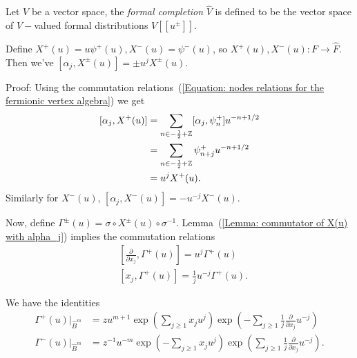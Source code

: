 \begin{dang}
    \begin{definition}
        Let $V$ be a vector space, the \textit{formal completion} $\hat{V}$ is defined to be the vector space of $V-$valued formal distributions $V[[u^\pm]]$.
    \end{definition}
\end{dang}
\begin{dang}
    \begin{lemma}\label{Lemma: commutator of X(u) with alpha_j}
       Define $X^+(u)=u\psi^+(u), X^-(u)=\psi^-(u)$, so $X^+(u),X^-(u):F\rightarrow \hat{F}$. Then we've $[\alpha_j,X^\pm(u)]=\pm u^{ j}X^\pm(u)$. 
    \end{lemma}
\end{dang}
Proof: Using the commutation relations~(\ref{Equation: nodes relations for the fermionic vertex algebra}) we get
\begin{equation}
    \begin{split}
        [\alpha_j,X^+(u)]&=\sum_{n\in-\frac{1}{2}+\mathbb{Z}}[\alpha_j,\psi^+_n]u^{-n+1/2}\\
        &=\sum_{n\in-\frac{1}{2}+\mathbb{Z}}\psi^+_{n+j}u^{-n+1/2}\\
        &=u^jX^+(u).
    \end{split}
\end{equation}
Similarly for $X^-(u)$, $[\alpha_j,X^-(u)]=-u^{-j}X^-(u)$.\par
Now, define $\Gamma^\pm(u)=\sigma\circ X^\pm(u)\circ\sigma^{-1}$. Lemma~(\ref{Lemma: commutator of X(u) with alpha_j}) implies the commutation relations
\begin{equation}\label{Equaiton: commuation relation between Gamma+ and a_j, a_-j}
\begin{split}
    &\left[\frac{\partial}{\partial x_j},\Gamma^+(u)\right]=u^j\Gamma^+(u)\\
    &[x_j,\Gamma^+(u)]=\frac{1}{j}u^{-j}\Gamma^+(u).
\end{split}
\end{equation}
\begin{dang}
    \begin{lemma}\cite{kac2013bombay}
        We have the identities
        \begin{equation}\label{Equation: vertex operator for Gamma+}
        \begin{split}
             \Gamma^+(u)\bigl|_{\hat{B}^m}&=zu^{m+1}\exp\left(\sum_{j\geq1}x_ju^j\right)\exp\left(-\sum_{j\geq1}\frac{1}{j}\frac{\partial}{\partial x_j}u^{-j}\right)\\
              \Gamma^-(u)\bigl|_{\hat{B}^m}&=z^{-1}u^{-m}\exp\left(-\sum_{j\geq1}x_ju^j\right)\exp\left(\sum_{j\geq1}\frac{1}{j}\frac{\partial}{\partial x_j}u^{-j}\right).
        \end{split}
        \end{equation}
    \end{lemma}
\end{dang}
